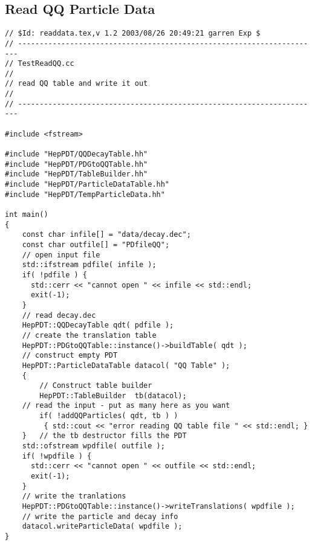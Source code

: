 \subsection { Read QQ Particle Data }
\begin{verbatim}
// $Id: readdata.tex,v 1.2 2003/08/26 20:49:21 garren Exp $
// ----------------------------------------------------------------------
// TestReadQQ.cc
//
// read QQ table and write it out
//
// ----------------------------------------------------------------------

#include <fstream>

#include "HepPDT/QQDecayTable.hh"
#include "HepPDT/PDGtoQQTable.hh"
#include "HepPDT/TableBuilder.hh"
#include "HepPDT/ParticleDataTable.hh"
#include "HepPDT/TempParticleData.hh"

int main()
{
    const char infile[] = "data/decay.dec";
    const char outfile[] = "PDfileQQ";
    // open input file
    std::ifstream pdfile( infile );
    if( !pdfile ) { 
      std::cerr << "cannot open " << infile << std::endl;
      exit(-1);
    }
    // read decay.dec 
    HepPDT::QQDecayTable qdt( pdfile );
    // create the translation table
    HepPDT::PDGtoQQTable::instance()->buildTable( qdt );
    // construct empty PDT
    HepPDT::ParticleDataTable datacol( "QQ Table" );
    {
        // Construct table builder
        HepPDT::TableBuilder  tb(datacol);
	// read the input - put as many here as you want
        if( !addQQParticles( qdt, tb ) ) 
	     { std::cout << "error reading QQ table file " << std::endl; }
    }	// the tb destructor fills the PDT
    std::ofstream wpdfile( outfile );
    if( !wpdfile ) { 
      std::cerr << "cannot open " << outfile << std::endl;
      exit(-1);
    }
    // write the tranlations
    HepPDT::PDGtoQQTable::instance()->writeTranslations( wpdfile );
    // write the particle and decay info
    datacol.writeParticleData( wpdfile );
}
\end{verbatim}

\vfill\eject
